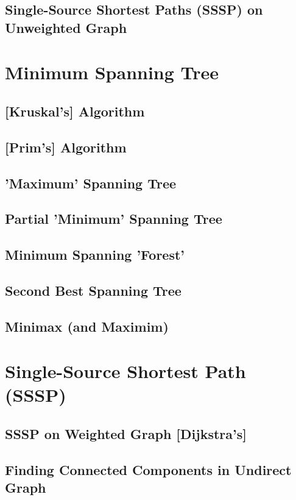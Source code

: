 	\subsection {Single-Source Shortest Paths (SSSP) on Unweighted Graph}
\section {Minimum Spanning Tree}
	\subsection {[Kruskal's] Algorithm}
	\subsection {[Prim's] Algorithm}
	\subsection {'Maximum' Spanning Tree}
	\subsection {Partial 'Minimum' Spanning Tree}
	\subsection {Minimum Spanning 'Forest'}
	\subsection {Second Best Spanning Tree}
	\subsection {Minimax (and Maximim)}
\section {Single-Source Shortest Path (SSSP)}
	\subsection {SSSP on Weighted Graph [Dijkstra's]}
	  
	\subsection {Finding Connected Components in Undirect Graph}
		
